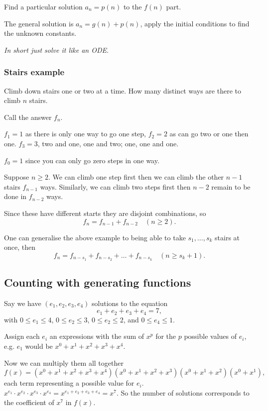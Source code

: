 \documentclass[10pt, a4paper]{article}
\begin{document}
Find a particular solution $a_n = p(n)$ to the $f(n)$ part.

The general solution is $a_n = g(n) + p(n)$,
apply the initial conditions to find the unknown constants.

\textit{In short just solve it like an ODE}.

\subsubsection{Stairs example}
\begin{example}
    Climb down stairs
    one or two at a time.
    How many distinct ways are there to climb $n$ stairs.

    \begin{solution}
        Call the answer $f_n$.

        $f_1 = 1$ as there is only one way to go one step,
        $f_2 = 2$ as can go two or one then one.
        $f_3 = 3$,
        two and one,
        one and two;
        one,
        one and one.

        $f_0 = 1$ since you can only go zero steps in one way.

        Suppose $n \geq 2$.
        We can climb one step first then we can climb the other $n - 1$ stairs $f_{n - 1}$ ways.
        Similarly,
        we can climb two steps first then $n - 2$ remain to be done in $f_{n - 2}$ ways.

        Since these have different starts they are disjoint combinations,
        so
        \[
        f_n = f_{n - 1} + f_{n - 2}\quad(n \geq 2).
        \]        
    \end{solution}
\end{example}

One can generalise the above example to being able to take $s_1, \dotsc, s_k$ stairs at once,
then
\[
f_n = f_{n - s_1} + f_{n - s_2} + \dotsc + f_{n - s_k}\quad(n \geq s_k + 1).
\]

\subsection{Counting with generating functions}
Say we have $(e_1, e_2, e_3, e_4)$ solutions to the equation
\[
e_1 + e_2 + e_3 + e_4 = 7,
\]
with $0 \leq e_1 \leq 4$,
$0 \leq e_2 \leq 3$,
$0 \leq e_2 \leq 2$,
and $0 \leq e_4 \leq 1$.

Assign each $e_i$ an expressions with the sum of $x ^ p$ for the $p$ possible values of $e_i$,
e.g.
$e_1$ would be $x ^ 0 + x ^ 1 + x ^ 2 + x ^ 3 + x ^ 4$.

Now we can multiply them all together
\[
f(x) = (x ^ 0 + x ^ 1 + x ^ 2 + x ^ 3 + x ^ 4)(x ^ 0 + x ^ 1 + x ^ 2 + x ^ 3)(x ^ 0 + x ^ 1 + x ^ 2)(x ^ 0 + x ^ 1),
\]
each term representing a possible value for $e_i$.
$x ^ {e_1}\cdot x ^ {e_2}\cdot x ^ {e_3}\cdot x ^ {e_4} = x ^ {e_1 + e_2 + e_3 + e_4} = x ^ 7$.
So the number of solutions corresponds to the coefficient of $x ^ 7$ in $f(x)$.
\end{document}
